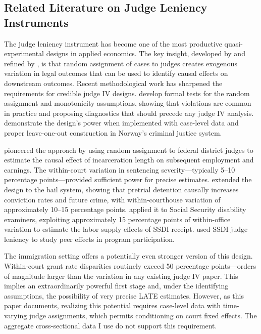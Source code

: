 \documentclass[12pt]{article}
\begin{document}
\subsection{Related Literature on Judge Leniency Instruments}

The judge leniency instrument has become one of the most productive quasi-experimental designs in applied economics. The key insight, developed by \citet{kling2006incarceration} and refined by \citet{kolesar2013estimation}, is that random assignment of cases to judges creates exogenous variation in legal outcomes that can be used to identify causal effects on downstream outcomes. Recent methodological work has sharpened the requirements for credible judge IV designs. \citet{frandsen2023judging} develop formal tests for the random assignment and monotonicity assumptions, showing that violations are common in practice and proposing diagnostics that should precede any judge IV analysis. \citet{bhuller2020incarceration} demonstrate the design's power when implemented with case-level data and proper leave-one-out construction in Norway's criminal justice system.

\citet{kling2006incarceration} pioneered the approach by using random assignment to federal district judges to estimate the causal effect of incarceration length on subsequent employment and earnings. The within-court variation in sentencing severity---typically 5--10 percentage points---provided sufficient power for precise estimates. \citet{dobbie2018effects} extended the design to the bail system, showing that pretrial detention causally increases conviction rates and future crime, with within-courthouse variation of approximately 10--15 percentage points. \citet{maestas2013does} applied it to Social Security disability examiners, exploiting approximately 15 percentage points of within-office variation to estimate the labor supply effects of SSDI receipt. \citet{dahl2014peer} used SSDI judge leniency to study peer effects in program participation.

The immigration setting offers a potentially even stronger version of this design. Within-court grant rate disparities routinely exceed 50 percentage points---orders of magnitude larger than the variation in any existing judge IV paper. This implies an extraordinarily powerful first stage and, under the identifying assumptions, the possibility of very precise LATE estimates. However, as this paper documents, realizing this potential requires case-level data with time-varying judge assignments, which permits conditioning on court fixed effects. The aggregate cross-sectional data I use do not support this requirement.
\end{document}
